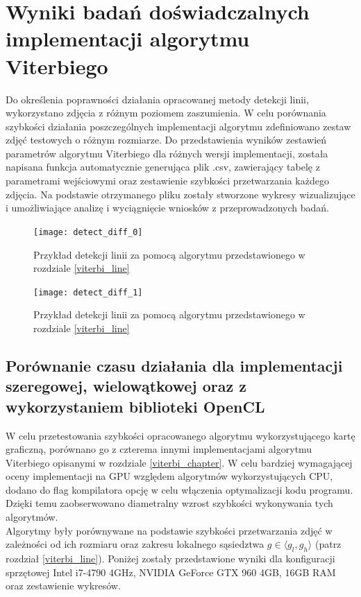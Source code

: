 \documentclass[document.tex]{subfiles}
\begin{document}
\chapter{Wyniki badań doświadczalnych \\ implementacji algorytmu Viterbiego}
\indent Do określenia poprawności działania opracowanej metody detekcji linii, 
wykorzystano zdjęcia z różnym poziomem zaszumienia. W celu porównania szybkości
działania poszczególnych implementacji algorytmu zdefiniowano zestaw zdjęć testowych
o różnym rozmiarze. Do przedstawienia wyników zestawień parametrów algorytmu Viterbiego
dla różnych wersji implementacji, została napisana funkcja automatycznie generująca plik .csv,
zawierający tabelę z parametrami wejściowymi oraz zestawienie szybkości przetwarzania każdego zdjęcia.
Na podstawie otrzymanego pliku zostały stworzone wykresy wizualizujące i umożliwiające
analizę i wyciągnięcie wniosków z przeprowadzonych badań.

\begin{figure}[h]
\texttt{[image: detect\_diff\_0]}
\caption{Przykład detekcji linii za pomocą algorytmu przedstawionego w rozdziale \ref{viterbi_line}}
\label{fig:sample_detect_0}
\end{figure}

\clearpage

\begin{figure}[h]
\texttt{[image: detect\_diff\_1]}
\caption{Przykład detekcji linii za pomocą algorytmu przedstawionego w rozdziale \ref{viterbi_line}}
\label{fig:sample_detect_1}
\end{figure}

\section{Porównanie czasu działania dla implementacji szeregowej, wielowątkowej
oraz z wykorzystaniem biblioteki OpenCL}
\indent W celu przetestowania szybkości opracowanego algorytmu wykorzystującego
kartę graficzną, porównano go z czterema innymi implementacjami algorytmu Viterbiego opisanymi
w rozdziale \ref{viterbi_chapter}.
W celu bardziej wymagającej oceny implementacji na GPU względem algorytmów wykorzystujących CPU, dodano
do flag kompilatora opcję  w celu włączenia optymalizacji kodu programu.
Dzięki temu zaobserwowano diametralny wzrost szybkości wykonywania tych algorytmów.
\\
\indent Algorytmy były porównywane na podstawie szybkości przetwarzania zdjęć
w zależności od ich rozmiaru oraz zakresu lokalnego sąsiedztwa $g\in \langle g_l, g_h \rangle$
(patrz rozdział \ref{viterbi_line}). Poniżej zostały przedstawione wyniki dla konfiguracji sprzętowej 
Intel i7-4790 4GHz, NVIDIA GeForce GTX 960 4GB, 16GB RAM oraz zestawienie wykresów.
\end{document}
